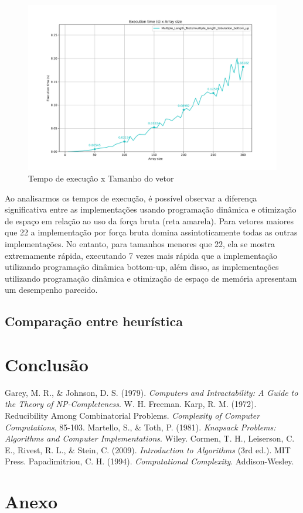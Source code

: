 \documentclass{article}
\begin{document}
\begin{figure} [H]
    \centering
    \caption{Tempo de execução x Tamanho do vetor}
    \includegraphics[width=1\textwidth]{images/multiple_length_tabulation_bottom_up.png}
\end{figure}

Ao analisarmos os tempos de execução, é possível observar a diferença significativa entre as implementações usando programação dinâmica e otimização de espaço em relação ao uso da força bruta (reta amarela). Para vetores maiores que 22 a implementação por força bruta domina assintoticamente todas as outras implementações. No entanto, para tamanhos menores que 22, ela se mostra extremamente rápida, executando 7 vezes mais rápida que a implementação utilizando programação dinâmica bottom-up, além disso, as implementações utilizando programação dinâmica e otimização de espaço de memória apresentam um desempenho parecido.

\subsection{Comparação entre heurística}


\section{Conclusão}




\begin{thebibliography}{99}
 Garey, M. R., \& Johnson, D. S. (1979). \textit{Computers and Intractability: A Guide to the Theory of NP-Completeness}. W. H. Freeman.
 Karp, R. M. (1972). Reducibility Among Combinatorial Problems. \textit{Complexity of Computer Computations}, 85-103.
 Martello, S., \& Toth, P. (1981). \textit{Knapsack Problems: Algorithms and Computer Implementations}. Wiley.
 Cormen, T. H., Leiserson, C. E., Rivest, R. L., \& Stein, C. (2009). \textit{Introduction to Algorithms} (3rd ed.). MIT Press.
 Papadimitriou, C. H. (1994). \textit{Computational Complexity}. Addison-Wesley.
\end{thebibliography}

\section{Anexo}
\end{document}
